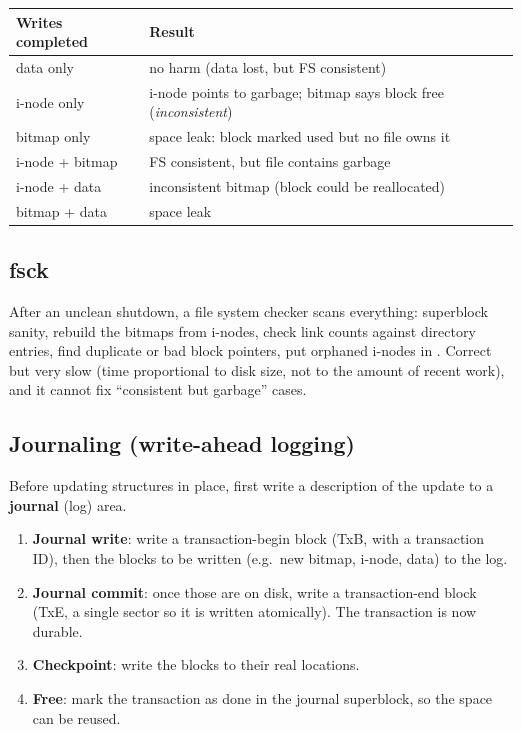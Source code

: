 \begin{center}
\begin{tabular}{@{}ll@{}}
\toprule
Writes completed & Result \\
\midrule
data only & no harm (data lost, but FS consistent) \\
i-node only & i-node points to garbage; bitmap says block free (\emph{inconsistent}) \\
bitmap only & space leak: block marked used but no file owns it \\
i-node + bitmap & FS consistent, but file contains garbage \\
i-node + data & inconsistent bitmap (block could be reallocated) \\
bitmap + data & space leak \\
\bottomrule
\end{tabular}
\end{center}

\subsection{fsck}
After an unclean shutdown, a file system checker scans everything: superblock sanity, rebuild
the bitmaps from i-nodes, check link counts against directory entries, find duplicate or bad
block pointers, put orphaned i-nodes in . Correct but very slow (time
proportional to disk size, not to the amount of recent work), and it cannot fix ``consistent but
garbage'' cases.

\subsection{Journaling (write-ahead logging)}
Before updating structures in place, first write a description of the update to a
\textbf{journal} (log) area.

\begin{enumerate}
  \item \textbf{Journal write}: write a transaction-begin block (TxB, with a transaction ID),
    then the blocks to be written (e.g.\ new bitmap, i-node, data) to the log.
  \item \textbf{Journal commit}: once those are on disk, write a transaction-end block (TxE,
    a single sector so it is written atomically). The transaction is now durable.
  \item \textbf{Checkpoint}: write the blocks to their real locations.
  \item \textbf{Free}: mark the transaction as done in the journal superblock, so the space can
    be reused.
\end{enumerate}


